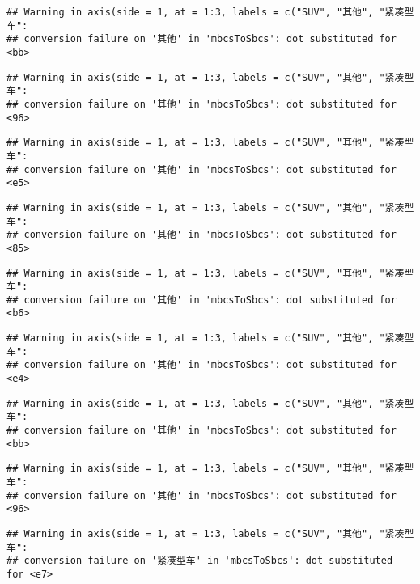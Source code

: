\documentclass[]{article}
\begin{document}
\begin{verbatim}
## Warning in axis(side = 1, at = 1:3, labels = c("SUV", "其他", "紧凑型车":
## conversion failure on '其他' in 'mbcsToSbcs': dot substituted for <bb>
\end{verbatim}

\begin{verbatim}
## Warning in axis(side = 1, at = 1:3, labels = c("SUV", "其他", "紧凑型车":
## conversion failure on '其他' in 'mbcsToSbcs': dot substituted for <96>
\end{verbatim}

\begin{verbatim}
## Warning in axis(side = 1, at = 1:3, labels = c("SUV", "其他", "紧凑型车":
## conversion failure on '其他' in 'mbcsToSbcs': dot substituted for <e5>
\end{verbatim}

\begin{verbatim}
## Warning in axis(side = 1, at = 1:3, labels = c("SUV", "其他", "紧凑型车":
## conversion failure on '其他' in 'mbcsToSbcs': dot substituted for <85>
\end{verbatim}

\begin{verbatim}
## Warning in axis(side = 1, at = 1:3, labels = c("SUV", "其他", "紧凑型车":
## conversion failure on '其他' in 'mbcsToSbcs': dot substituted for <b6>
\end{verbatim}

\begin{verbatim}
## Warning in axis(side = 1, at = 1:3, labels = c("SUV", "其他", "紧凑型车":
## conversion failure on '其他' in 'mbcsToSbcs': dot substituted for <e4>
\end{verbatim}

\begin{verbatim}
## Warning in axis(side = 1, at = 1:3, labels = c("SUV", "其他", "紧凑型车":
## conversion failure on '其他' in 'mbcsToSbcs': dot substituted for <bb>
\end{verbatim}

\begin{verbatim}
## Warning in axis(side = 1, at = 1:3, labels = c("SUV", "其他", "紧凑型车":
## conversion failure on '其他' in 'mbcsToSbcs': dot substituted for <96>
\end{verbatim}

\begin{verbatim}
## Warning in axis(side = 1, at = 1:3, labels = c("SUV", "其他", "紧凑型车":
## conversion failure on '紧凑型车' in 'mbcsToSbcs': dot substituted for <e7>
\end{verbatim}
\end{document}
